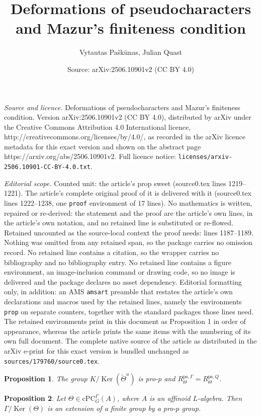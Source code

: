 \documentclass[10pt,a4paper]{amsart}
\title{Deformations of pseudocharacters and Mazur's finiteness condition}
\author{Vytautas Pa\v{s}k\=unas, Julian Quast}
\date{Source: arXiv:2506.10901v2 (CC BY 4.0)}
\newtheorem{prop}{Proposition}
\DeclareMathOperator{\Ker}{Ker}
\newcommand{\cPC}{\mathrm{cPC}}
\newcommand{\ps}{\mathrm{ps}}
\newcommand{\wTheta}{\widetilde{\Theta}}
\begin{document}
\maketitle

\noindent\emph{Source and licence.} Deformations of pseudocharacters and Mazur's finiteness condition. Version arXiv:2506.10901v2 (CC BY 4.0), distributed by arXiv under the Creative Commons Attribution 4.0 International licence, http://creativecommons.org/licenses/by/4.0/, as recorded in the arXiv licence metadata for this exact version and shown on the abstract page https://arxiv.org/abs/2506.10901v2. Full licence notice: \texttt{licenses/arxiv-2506.10901-CC-BY-4.0.txt}.\par\smallskip

\noindent\textit{Editorial scope.} Counted unit: the article's prop sweet (source0.tex lines 1219--1221). The article's complete original proof of it is delivered with it (source0.tex lines 1222--1238, one \texttt{proof} environment of 17 lines). No mathematics is written, repaired or re-derived: the statement and the proof are the article's own lines, in the article's own notation, and no retained line is substituted or re-flowed.  Retained uncounted as the source-local context the proof needs: lines 1187--1189.  Nothing was omitted from any retained span, so the package carries no omission record.  No retained line contains a citation, so the wrapper carries no bibliography and no bibliography entry.  No retained line contains a figure environment, an image-inclusion command or drawing code, so no image is delivered and the package declares no asset dependency.  Editorial formatting only, in addition: an AMS \texttt{amsart} preamble that restates the article's own declarations and macros used by the retained lines, namely the environments \texttt{prop} on separate counters, together with the standard packages those lines need.  The retained environments print in this document as Proposition 1 in order of appearance, whereas the article prints the same items with the numbering of its own full document.  The complete native source of the article as distributed in the arXiv e-print for this exact version is bundled unchanged as \texttt{sources/179760/source0.tex}.
\begin{prop}\label{main_kappa} The group $K/\Ker(\wTheta^u)$ is pro-$p$ and 
$R^{\ps, \Gamma}_{\Theta}=R^{\ps, Q}_{\Theta}$.
\end{prop}

\begin{prop}\label{sweet} Let $\Theta\in \cPC^{\Gamma}_G(A)$, where $A$ is an affinoid $L$-algebra.
Then $\Gamma/\Ker(\Theta)$ is an extension of a finite group by a pro-$p$ group.
\end{prop}
\end{document}
